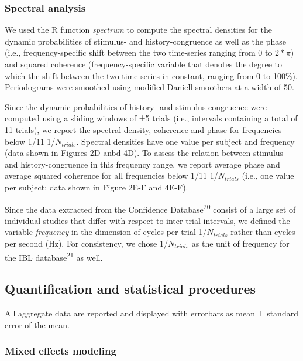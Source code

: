 \documentclass[
]{article}
\begin{document}
\hypertarget{spectral-analysis}{%
\subsubsection{Spectral analysis}\label{spectral-analysis}}

We used the R function \emph{spectrum} to compute the spectral densities
for the dynamic probabilities of stimulus- and history-congruence as
well as the phase (i.e., frequency-specific shift between the two
time-series ranging from 0 to \(2*\pi\)) and squared coherence
(frequency-specific variable that denotes the degree to which the shift
between the two time-series in constant, ranging from 0 to 100\%).
Periodograms were smoothed using modified Daniell smoothers at a width
of 50.

Since the dynamic probabilities of history- and stimulus-congruence were
computed using a sliding windows of ±5 trials (i.e., intervals
containing a total of 11 trials), we report the spectral density,
coherence and phase for frequencies below 1/11 1/\(N_{trials}\).
Spectral densities have one value per subject and frequency (data shown
in Figures 2D anbd 4D). To assess the relation between stimulus- and
history-congruence in this frequency range, we report average phase and
average squared coherence for all frequencies below 1/11
1/\(N_{trials}\) (i.e., one value per subject; data shown in Figure 2E-F
and 4E-F).

Since the data extracted from the Confidence
Database\textsuperscript{20} consist of a large set of individual
studies that differ with respect to inter-trial intervals, we defined
the variable \emph{frequency} in the dimension of cycles per trial
1/\(N_{trials}\) rather than cycles per second (Hz). For consistency, we
chose 1/\(N_{trials}\) as the unit of frequency for the IBL
database\textsuperscript{21} as well.

\hypertarget{quantification-and-statistical-procedures}{%
\subsection{Quantification and statistical
procedures}\label{quantification-and-statistical-procedures}}

All aggregate data are reported and displayed with errorbars as mean ±
standard error of the mean.

\hypertarget{mixed-effects-modeling}{%
\subsubsection{Mixed effects modeling}\label{mixed-effects-modeling}}
\end{document}
